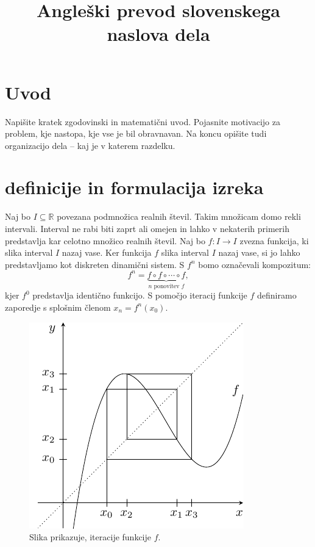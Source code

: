 \documentclass[mat2]{fmfdelo}
\title{Angleški prevod slovenskega naslova dela}
\newcommand{\R}{\mathbb R}
\begin{document}
\section{Uvod}
Napišite kratek zgodovinski in matematični uvod.  Pojasnite motivacijo za problem, kje
nastopa, kje vse je bil obravnavan. Na koncu opišite tudi organizacijo dela -- kaj je v
katerem razdelku.

\section{definicije in formulacija izreka}
Naj bo $I\subseteq \R$ povezana podmnožica realnih števil. Takim množicam domo rekli intervali. Interval ne rabi biti zaprt ali omejen in lahko v nekaterih primerih predstavlja kar celotno množico realnih števil. Naj bo $f:I \to I$ zvezna funkcija, ki slika interval $I$ nazaj vase. Ker funkcija $f$ slika interval $I$ nazaj vase, si jo lahko predstavljamo kot diskreten dinamični sistem. S $f^n$ bomo označevali kompozitum:
$$f^n = \underbrace{f \circ f \circ \cdots \circ f}_{n \text{ ponovitev } f},$$
kjer $f^0$ predstavlja identično funkcijo. S pomočjo iteracij funkcije $f$ definiramo zaporedje s splošnim členom $x_n = f^n(x_0)$.

\begin{figure}[h]
  \centering
  \includegraphics[]{images/iteracije_f.pdf}
  \caption[Primer vektorske slike.]{Slika prikazuje, iteracije funkcije $f$.}
  \label{fig:Iteracije}
\end{figure}
\end{document}
